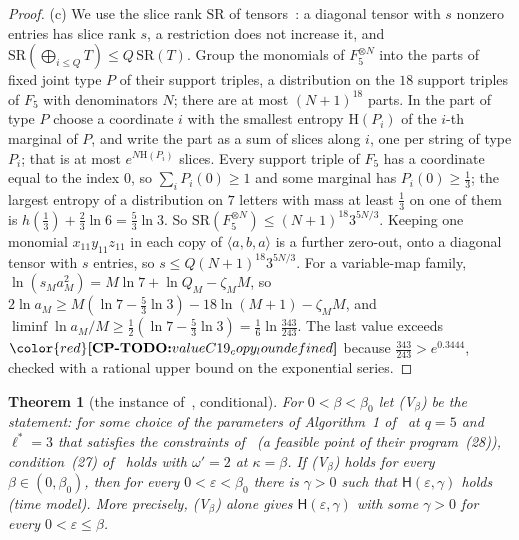 \documentclass[11pt]{article}
\makeatletter
\newtheorem{theorem}{Theorem}[section]
\theoremstyle{definition}
\theoremstyle{remark}
\DeclareRobustCommand{\CPTODO}[1]{{\color{red}\textbf{[CP-TODO:} #1\textbf{]}}}
\providecommand{\eps}{\varepsilon}
\newcommand{\Ent}{\mathrm{H}}                 %
\newcommand{\Hb}{h}                           %
\newcommand{\mat}[3]{\langle #1,#2,#3\rangle} %
\newcommand{\Hyp}{\mathsf{H}}                 %
\newcommand{\Vhyp}[1]{\textup{(V$_{#1}$)}}   %
\newcommand{\bz}{\beta_0}                    %
\newcommand{\cpv}[1]{\ifcsname cpv@#1\endcsname\csname cpv@#1\endcsname\else\CPTODO{value #1 undefined}\fi}
\makeatother
\begin{document}
\begin{proof}
(c) We use the slice rank $\mathrm{SR}$ of tensors~\cite{Tao16}: a diagonal tensor with $s$ nonzero entries has slice rank $s$, a restriction does not increase it, and $\mathrm{SR}(\bigoplus_{i\le Q}T)\le Q\,\mathrm{SR}(T)$. Group the monomials of $F_5^{\otimes N}$ into the parts of fixed joint type $P$ of their support triples, a distribution on the $18$ support triples of $F_5$ with denominators $N$; there are at most $(N+1)^{18}$ parts. In the part of type $P$ choose a coordinate $i$ with the smallest entropy $\Ent(P_i)$ of the $i$-th marginal of $P$, and write the part as a sum of slices along $i$, one per string of type $P_i$; that is at most $e^{N\Ent(P_i)}$ slices. Every support triple of $F_5$ has a coordinate equal to the index $0$, so $\sum_iP_i(0)\ge1$ and some marginal has $P_i(0)\ge\frac13$; the largest entropy of a distribution on $7$ letters with mass at least $\frac13$ on one of them is $\Hb(\frac13)+\frac23\ln6=\frac53\ln3$. So $\mathrm{SR}(F_5^{\otimes N})\le(N+1)^{18}3^{5N/3}$. Keeping one monomial $x_{11}y_{11}z_{11}$ in each copy of $\mat aba$ is a further zero-out, onto a diagonal tensor with $s$ entries, so $s\le Q(N+1)^{18}3^{5N/3}$. For a variable-map family, $\ln(s_Ma_M^2)=M\ln7+\ln Q_M-\zeta_MM$, so $2\ln a_M\ge M(\ln7-\frac53\ln3)-18\ln(M+1)-\zeta_MM$, and $\liminf\ln a_M/M\ge\frac12(\ln7-\frac53\ln3)=\frac16\ln\frac{343}{243}$. The last value exceeds $\cpv{C19_copy_lo}$ because $\frac{343}{243}>e^{0.3444}$, checked with a rational upper bound on the exponential series.
\end{proof}

\begin{theorem}[the instance of~\cite{VXXZ24}, conditional]\label{cp:C20}
For $0<\beta<\bz$ let \Vhyp\beta{} be the statement: for some choice of the parameters of Algorithm~1 of~\cite{VXXZ24} at $q=5$ and $\ell^*=3$ that satisfies the constraints of~\cite[Theorems~5.3, 6.1 and~6.3]{VXXZ24} (a feasible point of their program~(28)), condition~(27) of~\cite{VXXZ24} holds with $\omega'=2$ at $\kappa=\beta$. If \Vhyp\beta{} holds for every $\beta\in(0,\bz)$, then for every $0<\eps<\bz$ there is $\gamma>0$ such that $\Hyp(\eps,\gamma)$ holds (time model). More precisely, \Vhyp\beta{} alone gives $\Hyp(\eps,\gamma)$ with some $\gamma>0$ for every $0<\eps\le\beta$.
\end{theorem}
\end{document}
